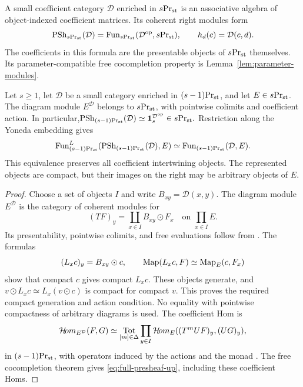 A small coefficient category $\mathcal D$ enriched in
${s}\mathrm{Pr}_{\mathrm{st}}$ is an associative algebra of object-indexed coefficient
matrices. Its coherent right modules form
\[
 \operatorname{PSh}_{{s}\mathrm{Pr}_{\mathrm{st}}}(\mathcal D)=\operatorname{Fun}_{{s}\mathrm{Pr}_{\mathrm{st}}}(\mathcal D^{\mathrm{op}},{s}\mathrm{Pr}_{\mathrm{st}}),
 \qquad h_d(c)=\mathcal D(c,d).
\]
The coefficients in this formula are the presentable objects of
${s}\mathrm{Pr}_{\mathrm{st}}$ themselves. Its parameter-compatible free cocompletion property
is Lemma~\ref{lem:parameter-modules}.



\begin{lemma}\label{lem:parameter-modules}


Let $s\geq1$, let $\mathcal D$ be a small category
enriched in ${(s-1)}\mathrm{Pr}_{\mathrm{st}}$, and let $E\in{s}\mathrm{Pr}_{\mathrm{st}}$.
The diagram module $E^{\mathcal D}$ belongs to
${s}\mathrm{Pr}_{\mathrm{st}}$, with pointwise colimits and coefficient
action. In particular,$\operatorname{PSh}_{{(s-1)}\mathrm{Pr}_{\mathrm{st}}}(\mathcal D)
 \simeq \mathbf 1_s^{\mathcal D^{\mathrm{op}}}\in{s}\mathrm{Pr}_{\mathrm{st}}.$
Restriction along the Yoneda embedding gives
\begin{equation}\label{eq:full-presheaf-up}
 \operatorname{Fun}^L_{{(s-1)}\mathrm{Pr}_{\mathrm{st}}}(\operatorname{PSh}_{{(s-1)}\mathrm{Pr}_{\mathrm{st}}}(\mathcal D),E)
 \simeq\operatorname{Fun}_{{(s-1)}\mathrm{Pr}_{\mathrm{st}}}(\mathcal D,E).
\end{equation}
This equivalence preserves all coefficient intertwining objects.
The represented objects are compact, but their images on the right
may be arbitrary objects of $E$.
\end{lemma}

\begin{proof}
Choose a set of objects $I$ and write $B_{xy}=\mathcal D(x,y)$.
The diagram module $E^{\mathcal D}$ is the category of coherent modules for
\[
 (TF)_y=\coprod_{x\in I}B_{xy}\odot F_x
 \quad\text{on }\prod_{x\in I}E.
\]
Its presentability, pointwise colimits, and free evaluations follow
from \cite[Theorem~4.43 and Corollary~4.44]{HeineBi}. The formulas
\[
 (L_xc)_y=B_{xy}\odot c,\qquad
 \operatorname{Map}(L_xc,F)\simeq\operatorname{Map}_E(c,F_x)
\]
show that compact $c$ gives compact $L_xc$. These objects generate,
and $v\odot L_xc\simeq L_x(v\odot c)$ is compact for compact $v$.
This proves the required compact generation and action condition.
No equality with pointwise compactness of arbitrary diagrams is used.
The coefficient Hom is
\begin{equation}\label{eq:parameter-bar-hom}
 \mathcal{H}\!om_{E^{\mathcal D}}(F,G)
 \simeq\operatorname*{Tot}_{[m]\in\Delta}
 \prod_{y\in I}\mathcal{H}\!om_E((T^mUF)_y,(UG)_y),
\end{equation}
in ${(s-1)}\mathrm{Pr}_{\mathrm{st}}$, with operators induced by the actions
and the monad
\citep[Corollary~4.49]{HeineBi}. The free cocompletion theorem
\citep[Theorems~3.41(4) and~4.84]{HeineBi} gives
\eqref{eq:full-presheaf-up}, including these coefficient Homs.
\end{proof}


